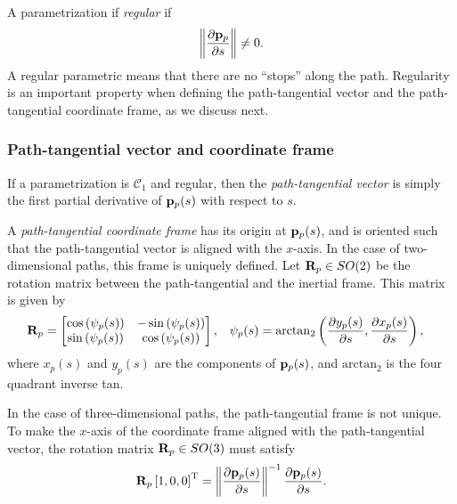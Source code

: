 A parametrization if \emph{regular} if
\begin{equation}
    \left\|\frac{\partial \mathbf{p}_p}{\partial s}\right\| \neq 0.
\end{equation}
A regular parametric means that there are no ``stops'' along the path.
Regularity is an important property when defining the path-tangential vector and the path-tangential coordinate frame, as we discuss next.

\subsubsection*{Path-tangential vector and coordinate frame}
If a parametrization is $\mathcal{C}_1$ and regular, then the \emph{path-tangential vector} is simply the first partial derivative of $\mathbf{p}_p(s)$ with respect to $s$.

A \emph{path-tangential coordinate frame} has its origin at $\mathbf{p}_p(s)$, and is oriented such that the path-tangential vector is aligned with the $x$-axis.
In the case of two-dimensional paths, this frame is uniquely defined.
Let $\mathbf{R}_p \in SO(2)$ be the rotation matrix between the path-tangential and the inertial frame.
This matrix is given by
\begin{align}
    \mathbf{R}_p &= 
    \begin{bmatrix}
        \cos\left(\psi_p(s)\right) & -\sin\left(\psi_p(s)\right) \\ \sin\left(\psi_p(s)\right) & \cos\left(\psi_p(s)\right)
    \end{bmatrix}, &
    \psi_p(s) &= \mathrm{arctan}_2\left(\frac{\partial y_p(s)}{\partial s}, \frac{\partial x_p(s)}{\partial s}\right),
\end{align}
where $x_p(s)$ and $y_p(s)$ are the components of $\mathbf{p}_p(s)$, and $\mathrm{arctan}_2$ is the four quadrant inverse tan.

In the case of three-dimensional paths, the path-tangential frame is not unique.
To make the $x$-axis of the coordinate frame aligned with the path-tangential vector, the rotation matrix $\mathbf{R}_p \in SO(3)$ must satisfy
\begin{equation}
    \mathbf{R}_p \left[1, 0, 0\right]^{\mathrm{T}} = \left\|\frac{\partial \mathbf{p}_p(s)}{\partial s}\right\|^{-1} \frac{\partial \mathbf{p}_p(s)}{\partial s}.
\end{equation}

